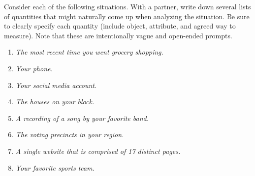 %
%
%
%

\newpage
{}

\bsp
\begin{activity}
\label{activity:identifying_lists_of_quantities}
Consider each of the following situations.
With a partner, write down several lists of quantities that might naturally come up when analyzing the situation.
Be sure to clearly specify each quantity (include object, attribute, and agreed way to measure).  
Note that these are intentionally vague and open-ended prompts.
\begin{enumerate}[label=(\alph*)]
\item \textit{The most recent time you went grocery shopping.}
\item \textit{Your phone.}
\item \textit{Your social media account.}
\item \textit{The houses on your block.}  
\item \textit{A recording of a song by your favorite band.}
\item \textit{The voting precincts in your region.}
\item \textit{A single website that is comprised of 17 distinct pages.}
\item \textit{Your favorite sports team.}
\end{enumerate}
\end{activity}  
\esp  

